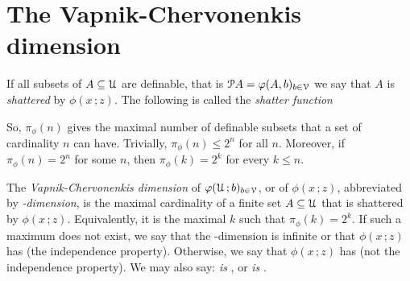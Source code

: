 \documentclass[scombinatorics.tex]{subfiles}
\begin{document}






\section{The Vapnik-Chervonenkis dimension}\label{VCdim}

If all subsets of $A\subseteq\EuScript U$ are definable, that is $\EuScript P A=\varphi(A,b)_{b\in\EuScript V}$ we say that $A$ is \emph{shattered\/} by $\phi(x\,;z)$.
The following is called the \emph{shatter function\/}



So, $\pi_\phi(n)$ gives the maximal number of definable subsets that a set of cardinality $n$ can have.
Trivially, $\pi_\phi(n)\le2^n$ for all $n$.
Moreover, if $\pi_\phi(n)=2^n$ for some $n$, then $\pi_\phi(k)=2^k$ for every $k\le n$.

The \emph{Vapnik-Chervonenkis dimension\/} of $\varphi(\EuScript U\,;b)_{b\in\EuScript V}$, or of $\phi(x\,;z)$, abbreviated by \emph{\vc-dimension}, is the maximal cardinality of a finite set $A\subseteq\EuScript U$ that is shattered by $\phi(x\,;z)$.
Equivalently, it is the maximal $k$ such that $\pi_\phi(k)=2^k$.
If such a maximum does not exist,
we say that the \vc-dimension is infinite or that $\phi(x\,;z)$ has \emph{\ip\/} (the independence property).
Otherwise, we say that $\phi(x\,;z)$ has \emph{\nip\/} (not the independence property).
We may also say: \textit{is\/} \ip, or \textit{is\/} \nip.
\end{document}
